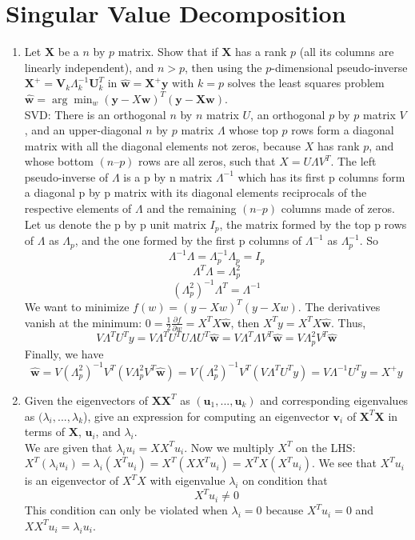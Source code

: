 

\section{Singular Value Decomposition}

\begin{enumerate}
\item Let $\mathbf{X}$ be a $n$ by $p$ matrix. Show that if $\mathbf{X}$ has a rank $p$ (all its columns are linearly independent), and $n > p$, then using the $p$-dimensional pseudo-inverse $\mathbf{X}^{+} = \mathbf{V}_k \Lambda_k^{-1}\mathbf{U}_k^T$ in $\mathbf{\hat{w}}=\mathbf{X}^{+}\mathbf{y}$ with $k=p$ solves the least squares problem $\mathbf{\hat{w}} = \arg \min_{w} (\mathbf{y}-X\mathbf{w})^T(\mathbf{y}-\mathbf{X}\mathbf{w})$.
~\\

SVD: There is an orthogonal $n$ by $n$ matrix $U$, an orthogonal $p$ by $p$ matrix $V$, and an upper-diagonal $n$ by $p$ matrix $\Lambda$ whose top $p$ rows form a diagonal matrix with all the diagonal elements not zeros, because $X$ has rank $p$, and whose bottom $(n – p)$ rows are all zeros, such that
$X = U\Lambda V^T$. The left pseudo-inverse of $\Lambda$ is a p by n matrix $\Lambda^{-1}$ which has its first p columns form a diagonal p by p matrix with its diagonal elements reciprocals of the respective elements of $\Lambda$ and the remaining $(n – p)$ columns made of zeros.\\
Let us denote the p by p unit matrix $I_p$, the matrix formed by the top p rows of $\Lambda$ as $\Lambda_p$, and the one formed by the first p columns of $\Lambda^{-1}$ as $\Lambda_p^{-1}$. So
\[
\Lambda^{-1} \Lambda = \Lambda_p^{-1} \Lambda_p = I_p
\]
\[
\Lambda^T \Lambda = \Lambda_p^2
\]
\[
(\Lambda_p^2)^{-1} \Lambda^T = \Lambda^{-1}
\]
We want to minimize $f(w)=(y-Xw)^T(y-Xw)$. The derivatives vanish at the minimum: $0=\frac{1}{2}\frac{\partial f}{\partial w}=X^TX\mathbf{\hat{w}}$, then $X^Ty=X^TX\mathbf{\hat{w}}$. Thus,
\[
V\Lambda^T U^T y = V\Lambda^T U^T U\Lambda U^T\mathbf{\hat{w}} = V\Lambda^T \Lambda V^T\mathbf{\hat{w}} = V\Lambda_p^2 V^T\mathbf{\hat{w}}
\]
Finally, we have
\[
\mathbf{\hat{w}} = V(\Lambda_p^2)^{-1}V^T(V\Lambda_p^2 V^T\mathbf{\hat{w}}) =  V(\Lambda_p^2)^{-1}V^T(V\Lambda^T U^T y) = V\Lambda^{-1} U^T y = X^{+}y
\]

\item
Given the eigenvectors of $\mathbf{XX}^T$ as $(\mathbf{u}_1, ..., \mathbf{u}_k)$ and corresponding eigenvalues as $(\lambda_i, ..., \lambda_k$), give an expression for computing an eigenvector $\mathbf{v}_i$ of $\mathbf{X}^T\mathbf{X}$ in terms of $\mathbf{X}$, $\mathbf{u}_i$, and $\lambda_i$.
~\\
We are given that $\lambda_i u_i = XX^T u_i$. Now we multiply $X^T$ on the LHS: $X^T(\lambda_i u_i) = \lambda_i(X^T u_i) = X^T(XX^T u_i) = X^TX(X^T u_i)$. We see that $X^T u_i$ is an eigenvector of $X^T X$ with eigenvalue $\lambda_i$ on condition that
\[
X^T u_i \neq 0
\]
This condition can only be violated when $\lambda_i = 0$ because $X^T u_i = 0$ and $XX^T u_i = \lambda_i u_i$.


\end{enumerate}
